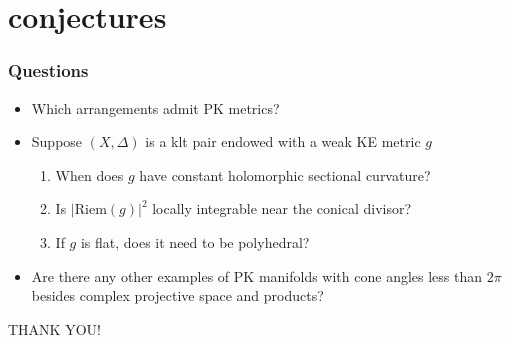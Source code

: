 \documentclass{beamer}
\begin{document}
\section{conjectures}
\begin{frame}
	\frametitle{Questions}
	\begin{itemize}
		\pause
		\item Which arrangements admit PK metrics?
		\pause
		\item Suppose \((X, \Delta)\) is a klt pair endowed with a weak KE metric \(g\)
		\begin{enumerate}
			\pause
			\item When does \(g\) have constant holomorphic sectional curvature?
			\pause
			\item Is \(|\mathrm{Riem}(g)|^2\) locally integrable near the conical divisor?
			\pause
			\item If \(g\) is flat, does it need to be polyhedral?
		\end{enumerate}
	\pause
	\item Are there any other examples of PK manifolds with cone angles less than \(2\pi\) besides complex projective space and products?
	\end{itemize}
\pause
\begin{center}
	\Huge{THANK YOU!}
\end{center}
\end{frame}
\end{document}
